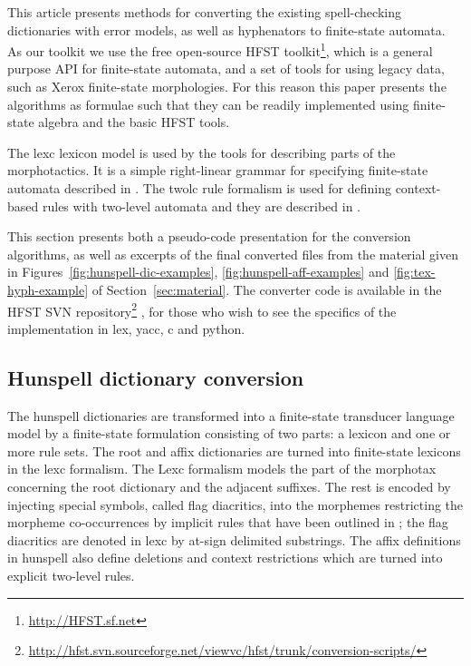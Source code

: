\documentclass[a4paper,runningheads]{llncs}
\begin{document}
This article presents methods for converting the existing spell-checking
dictionaries with error models, as well as hyphenators to finite-state
automata. As our toolkit we use the free open-source HFST
toolkit\footnote{\url{http://HFST.sf.net}}, which is a general purpose API for
finite-state automata, and a set of tools for using legacy data, such as Xerox
finite-state morphologies. For this reason this paper presents the algorithms
as formulae such that they can be readily implemented using finite-state
algebra and the basic HFST tools.

The lexc lexicon model is used by the tools for describing parts of the
morphotactics. It is a simple right-linear grammar for specifying finite-state
automata described in \cite{beesley/2003,conf/sfcm/Linden2009}. The twolc rule
formalism is used for defining context-based rules with two-level automata and
they are described in \cite{koskenniemi/1983,conf/sfcm/Linden2009}.

This section presents both a pseudo-code presentation for the conversion
algorithms, as well as excerpts of the final converted files from the material
given in Figures~\ref{fig:hunspell-dic-examples},
\ref{fig:hunspell-aff-examples} and \ref{fig:tex-hyph-example} of
Section~\ref{sec:material}.  The converter code is available in the HFST SVN
repository\footnote{\url{http://hfst.svn.sourceforge.net/viewvc/hfst/trunk/conversion-scripts/}}
, for those who wish to see the specifics of the implementation in
lex, yacc, c and python.

\subsection{Hunspell dictionary conversion}

The hunspell dictionaries are transformed into a finite-state transducer
language model by a finite-state formulation consisting of two parts: a lexicon
and one or more rule sets. The root and affix dictionaries are turned into
finite-state lexicons in the lexc formalism. The Lexc formalism models the part
of the morphotax concerning the root dictionary and the adjacent suffixes. The
rest is encoded by injecting special symbols, called flag diacritics, into the
morphemes restricting the morpheme co-occurrences by implicit rules that have
been outlined in \cite{beesley/1998}; the flag diacritics are denoted in lexc
by at-sign delimited substrings. The affix definitions in hunspell also define
deletions and context restrictions which are turned into explicit two-level
rules.
\end{document}
